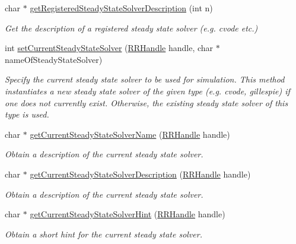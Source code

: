 \begin{DoxyCompactItemize}
char $\ast$ \hyperlink{group__simopts_ga090a38a435c4819945e8fc7724ff68f2}{get\+Registered\+Steady\+State\+Solver\+Description} (int n)
\begin{DoxyCompactList}\small\item\em Get the description of a registered steady state solver (e.\+g. cvode etc.) \end{DoxyCompactList}\item 
int \hyperlink{group__simopts_ga3f75fb22d03a7f532bedf31d45a791be}{set\+Current\+Steady\+State\+Solver} (\hyperlink{rrc__types_8h_a1d68f0592372208fa5a5f2799ea4b3ae}{R\+R\+Handle} handle, char $\ast$name\+Of\+Steady\+State\+Solver)
\begin{DoxyCompactList}\small\item\em Specify the current steady state solver to be used for simulation.  This method instantiates a new steady state solver of the given type (e.\+g. cvode, gillespie) if one does not currently exist. Otherwise, the existing steady state solver of this type is used. \end{DoxyCompactList}\item 
char $\ast$ \hyperlink{group__simopts_gac0d4601ea3af03c7c15353bb10bbd95f}{get\+Current\+Steady\+State\+Solver\+Name} (\hyperlink{rrc__types_8h_a1d68f0592372208fa5a5f2799ea4b3ae}{R\+R\+Handle} handle)
\begin{DoxyCompactList}\small\item\em Obtain a description of the current steady state solver. \end{DoxyCompactList}\item 
char $\ast$ \hyperlink{group__simopts_ga408c62750f0976ed81a84fbeb77980df}{get\+Current\+Steady\+State\+Solver\+Description} (\hyperlink{rrc__types_8h_a1d68f0592372208fa5a5f2799ea4b3ae}{R\+R\+Handle} handle)
\begin{DoxyCompactList}\small\item\em Obtain a description of the current steady state solver. \end{DoxyCompactList}\item 
char $\ast$ \hyperlink{group__simopts_ga7e0bc7da3c46b6869fc086ccea75d052}{get\+Current\+Steady\+State\+Solver\+Hint} (\hyperlink{rrc__types_8h_a1d68f0592372208fa5a5f2799ea4b3ae}{R\+R\+Handle} handle)
\begin{DoxyCompactList}\small\item\em Obtain a short hint for the current steady state solver. \end{DoxyCompactList}\item 

\end{DoxyCompactItemize}
